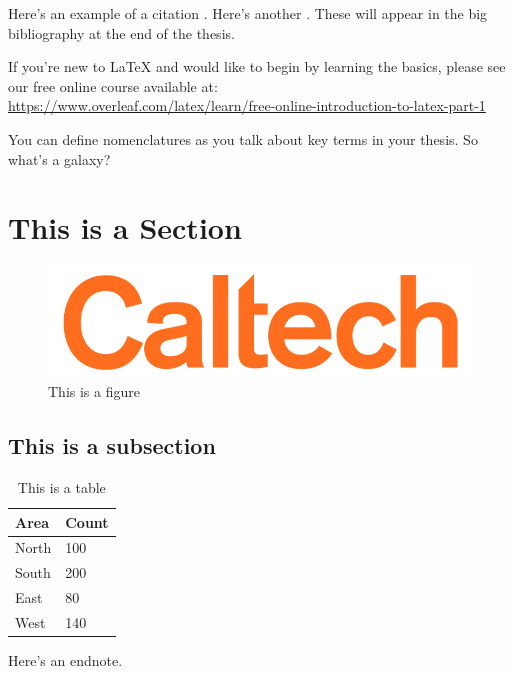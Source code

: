 \documentclass[12pt]{caltech_thesis}
\begin{document}
Here's an example of a citation \citep{GMP81}. Here's another \citep{PP98}. These will appear in the big bibliography at the end of the thesis.

If you're new to \LaTeX{} and would like to begin by learning the basics, please see our free online course available at:\\ \url{https://www.overleaf.com/latex/learn/free-online-introduction-to-latex-part-1} 

You can define nomenclatures  as you talk about key terms in your thesis. So what's a galaxy? %


\section{This is a Section}
\lipsum[1-2]

\begin{figure}[hbt!]
\centering
\includegraphics[width=.3\textwidth]{caltech.png}
\caption{This is a figure}\label{fig:logo}
\end{figure}

\subsection{This is a subsection}

\begin{table}[hbt!]
\centering
\begin{tabular}{ll}
\hline
Area & Count\\
\hline
North & 100\\
South & 200\\
East & 80\\
West & 140\\
\hline
\end{tabular}
\caption{This is a table}\label{tab:sample}
\end{table}

\lipsum[3] 

\lipsum[4-5] 

Here's an endnote.
\end{document}

